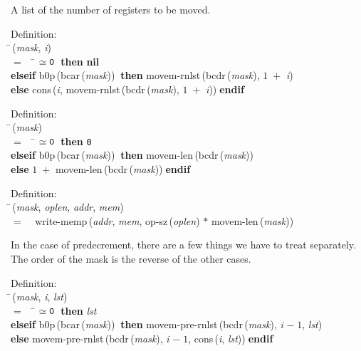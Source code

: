  A list of the number of registers to be moved.
\begin{tabbing}{\sc Definition}: \\  
\=\,({\it{mask\/}}, {\it{i\/}}) \\ 
$=$$\;\;\;\;$\= $\simeq {\tt{0}}$$\;\;${\bf then }{\bf{nil}} \\ 
{\bf elseif }{\rm{b0p}}\,({\rm{bcar}}\,({\it{mask\/}}))$\;\;${\bf then }{\rm{movem-rnlst}}\,({\rm{bcdr}}\,({\it{mask\/}}), $1\;+$ {\it{i\/}}) \\ 
{\bf else }{\rm{cons}}\,({\it{i\/}}, {\rm{movem-rnlst}}\,({\rm{bcdr}}\,({\it{mask\/}}), $1\;+$ {\it{i\/}}))$\;${\bf  endif}\-\-
\end{tabbing}

\begin{tabbing}{\sc Definition}: \\  
\=\,({\it{mask\/}}) \\ 
$=$$\;\;\;\;$\= $\simeq {\tt{0}}$$\;\;${\bf then }{\tt{0}} \\ 
{\bf elseif }{\rm{b0p}}\,({\rm{bcar}}\,({\it{mask\/}}))$\;\;${\bf then }{\rm{movem-len}}\,({\rm{bcdr}}\,({\it{mask\/}})) \\ 
{\bf else }$1\;+$ {\rm{movem-len}}\,({\rm{bcdr}}\,({\it{mask\/}}))$\;${\bf  endif}\-\-
\end{tabbing}

\begin{tabbing}{\sc Definition}: \\  
\=\,({\it{mask\/}}, {\it{oplen\/}}, {\it{addr\/}}, {\it{mem\/}}) \\ 
$=$$\;\;\;\;${\rm{write-memp}}\,({\it{addr\/}}, {\it{mem\/}}, {\rm{op-sz}}\,({\it{oplen\/}}) $*$ {\rm{movem-len}}\,({\it{mask\/}}))\-
\end{tabbing}

 In the case of predecrement, there are a few things we have to treat
 separately.
 The order of the mask is the reverse of the other cases.
\begin{tabbing}{\sc Definition}: \\  
\=\,({\it{mask\/}}, {\it{i\/}}, {\it{lst\/}}) \\ 
$=$$\;\;\;\;$\= $\simeq {\tt{0}}$$\;\;${\bf then }{\it{lst\/}} \\ 
{\bf elseif }{\rm{b0p}}\,({\rm{bcar}}\,({\it{mask\/}}))$\;\;${\bf then }{\rm{movem-pre-rnlst}}\,({\rm{bcdr}}\,({\it{mask\/}}), {\it{i\/}} $-\;1$, {\it{lst\/}}) \\ 
{\bf else }{\rm{movem-pre-rnlst}}\,({\rm{bcdr}}\,({\it{mask\/}}), {\it{i\/}} $-\;1$, {\rm{cons}}\,({\it{i\/}}, {\it{lst\/}}))$\;${\bf  endif}\-\-
\end{tabbing}

